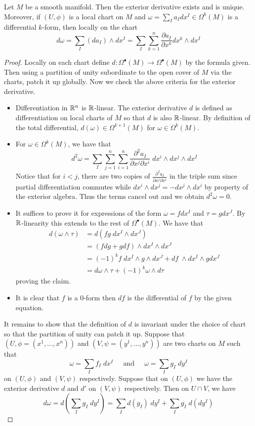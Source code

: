 \documentclass[a4paper]{article}
\begin{document}
\begin{thm}{}{} Let $M$ be a smooth manifold. Then the exterior derivative exists and is unique. Moreover, if $(U,\phi)$ is a local chart on $M$ and $\omega=\sum_Ia_Idx^I\in\Omega^k(M)$ is a differential $k$-form, then locally on the chart $$d\omega=\sum_I(da_I)\wedge dx^I=\sum_I\sum_{k=1}^n\frac{\partial a_I}{\partial x^k}dx^k\wedge dx^I$$ \tcbline
\begin{proof}
Locally on each chart define $d:\Omega^\bullet(M)\to\Omega^\bullet(M)$ by the formula given. Then using a partition of unity subordinate to the open cover of $M$ via the charts, patch it up globally. Now we check the above criteria for the exterior derivative. 

\begin{itemize}
\item Differentiation in $\mathbb{R}^n$ is $\mathbb{R}$-linear. The exterior derivative $d$ is defined as differentiation on local charts of $M$ so that $d$ is also $\mathbb{R}$-linear. By definition of the total differential, $d(\omega)\in\Omega^{k+1}(M)$ for $\omega\in\Omega^k(M)$. 
\item For $\omega\in\Omega^k(M)$, we have that $$d^2\omega=\sum_I\sum_{j=1}^n\sum_{i=1}^n\frac{\partial^2 a_I}{\partial x^j\partial x^i}\;dx^i\wedge dx^j\wedge dx^I$$ Notice that for $i<j$, there are two copies of $\frac{\partial^2 a_I}{\partial x^j\partial x^i}$ in the triple sum since partial differentiation commutes while $dx^i\wedge dx^j=-dx^j\wedge dx^i$ by property of the exterior algebra. Thus the terms cancel out and we obtain $d^2\omega=0$. 
\item It suffices to prove it for expressions of the form $\omega=fdx^I$ and $\tau=gdx^J$. By $\mathbb{R}$-linearity this extends to the rest of $\Omega^\bullet(M)$. We have that 
\begin{align*}
d(\omega\wedge\tau)&=d(fg\;dx^I\wedge dx^J)\\
&=(fdg+gdf)\wedge dx^I\wedge dx^J\\
&=(-1)^kf\;dx^I\wedge g\wedge dx^J+df\;\wedge dx^I\wedge gdx^J\\
&=d\omega\wedge\tau+(-1)^k\omega\wedge d\tau
\end{align*}
proving the claim. 
\item It is clear that $f$ is a $0$-form then $df$ is the differential of $f$ by the given equation. 
\end{itemize}
It remains to show that the definition of $d$ is invariant under the choice of chart so that the partition of unity can patch it up. Suppose that $(U,\phi=(x^1,\dots,x^n))$ and $(V,\psi=(y^1,\dots,y^n))$ are two charts on $M$ such that $$\omega=\sum_If_I\;dx^I\;\;\;\;\text{ and }\;\;\;\;\omega=\sum_Ig_I\;dy^I$$ on $(U,\phi)$ and $(V,\psi)$ respectively. Suppose that on $(U,\phi)$ we have the exterior derivative $d$ and $d'$ on $(V,\psi)$ respectively. Then on $U\cap V$, we have $$d\omega=d\left(\sum_Ig_I\;dy^I\right)=\sum_Id(g_I)\;dy^I+\sum_Ig_I\;d(dy^I)$$

\end{proof}
\end{thm}
\end{document}

